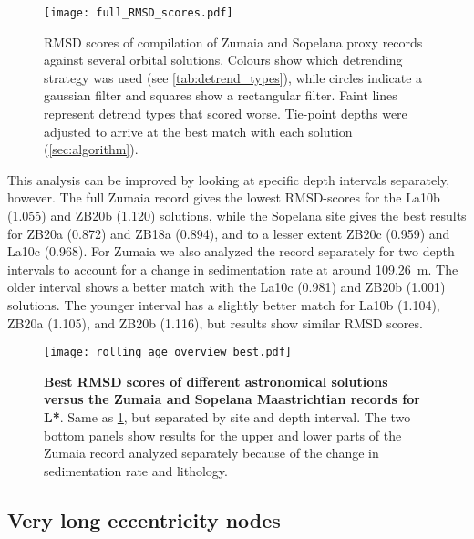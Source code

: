\documentclass[draft]{agujournal2019}
\begin{document}
\begin{figure}
    \centering
    \texttt{[image: full\_RMSD\_scores.pdf]}
    \caption{\label{fig:full-RMSD}
        \gls{RMSD} scores of compilation of Zumaia and Sopelana proxy records against several orbital solutions.
        Colours show which detrending strategy was used (see \cref{tab:detrend_types}), while circles indicate a gaussian filter and squares show a rectangular filter.
        Faint lines represent detrend types that scored worse.
        Tie-point depths were adjusted to arrive at the best match with each solution (\cref{sec:algorithm}).
    }
\end{figure}

This analysis can be improved by looking at specific depth intervals separately, however.
The full Zumaia record gives the lowest \gls{RMSD}-scores for the La10b (\num{1.055}) and ZB20b (\num{1.120}) solutions,
while the Sopelana site gives the best results for ZB20a (\num{0.872}) and ZB18a (\num{0.894}), and to a lesser extent ZB20c (\num{0.959}) and La10c (\num{0.968}).
For Zumaia we also analyzed the record separately for two depth intervals to account for a change in sedimentation rate at around \qty{109.26}{\metre}.
The older interval shows a better match with the La10c (\num{0.981}) and ZB20b (1.001) solutions.
The younger interval has a slightly better match for La10b (\num{1.104}), ZB20a (\num{1.105}), and ZB20b (\num{1.116}), but results show similar \gls{RMSD} scores.

\begin{figure}[htb]
  \centering
  \texttt{[image: rolling\_age\_overview\_best.pdf]}
  \caption{\label{fig:rolling-rmsd}
    \textbf{Best \gls{RMSD} scores of different astronomical solutions versus the Zumaia and Sopelana Maastrichtian records for \gls{L*}}.
    Same as \cref{fig:full-RMSD}, but separated by site and depth interval.
    The two bottom panels show results for the upper and lower parts of the Zumaia record analyzed separately because of the change in sedimentation rate and lithology.
}
\end{figure}

\subsection{Very long eccentricity nodes}
\end{document}
